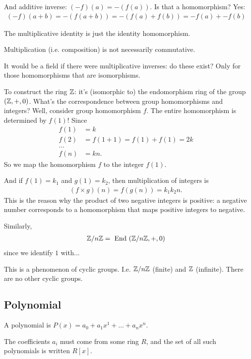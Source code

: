 And additive inverse: $(-f)(a) = -(f(a))$. Is that a homomorphism? Yes:
\begin{align*}
  (-f)(a + b) = -(f(a + b)) = -(f(a) + f(b)) = -f(a) + -f(b)
\end{align*}

The multiplicative identity is just the identity homomorphism.

Multiplication (i.e. composition) is not necessarily commutative.

It would be a field if there were multiplicative inverses: do these exist? Only
for those homomorphisms that are isomorphisms.

To construct the ring $\mathbb{Z}$: it's (isomorphic to) the endomorphism ring of the
group $(\mathbb{Z}, +, 0)$. What's the correspondence between group homomorphisms and
integers? Well, consider group homomorphism $f$. The entire homomorphism is
determined by $f(1)$! Since
\begin{align*}
  f(1) &= k\\
  f(2) &= f(1 + 1) = f(1) + f(1) = 2k\\
       \ldots\\
  f(n) &= kn.
\end{align*}
So we map the homomorphism $f$ to the integer $f(1)$.

And if $f(1) = k_1$ and $g(1) = k_2$, then multiplication of integers is
\begin{align*}
  (f \times g)(n) = f(g(n)) = k_1k_2n.
\end{align*}
This is the reason why the product of two negative integers is positive: a
negative number corresponds to a homomorphism that maps positive integers to
negative.

Similarly,
\begin{align*}
  \mathbb{Z}/n\mathbb{Z} = ~\text{End}~(\mathbb{Z}/n\mathbb{Z}, +, 0)
\end{align*}
since we identify $1$ with...

This is a phenomenon of cyclic groups. I.e. $\mathbb{Z}/n\mathbb{Z}$ (finite) and $\mathbb{Z}$
(infinite). There are no other cyclic groups.

\subsection{Polynomial}

A polynomial is $P(x) = a_0 + a_1x^1 + \ldots + a_nx^n$.

The coefficients $a_i$ must come from some ring $R$, and the set of all such
polynomials is written $R[x]$.

